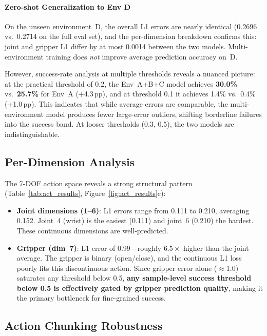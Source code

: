 \documentclass[10pt,twocolumn,letterpaper]{article}
\begin{document}
\paragraph{Zero-shot Generalization to Env D} On the unseen environment~D, the overall L1 errors are nearly identical (0.2696 vs.\ 0.2714 on the full eval set), and the per-dimension breakdown confirms this: joint and gripper L1 differ by at most 0.0014 between the two models. Multi-environment training does \emph{not} improve average prediction accuracy on~D.

However, success-rate analysis at multiple thresholds reveals a nuanced picture: at the practical threshold of 0.2, the Env~A+B+C model achieves \textbf{30.0\%} vs.\ \textbf{25.7\%} for Env~A (+4.3\,pp), and at threshold 0.1 it achieves 1.4\% vs.\ 0.4\% (+1.0\,pp). This indicates that while average errors are comparable, the multi-environment model produces fewer large-error outliers, shifting borderline failures into the success band. At looser thresholds (0.3, 0.5), the two models are indistinguishable.

\subsection{Per-Dimension Analysis}

The 7-DOF action space reveals a strong structural pattern (Table~\ref{tab:act_results}, Figure~\ref{fig:act_results}c):
\begin{itemize}
\item \textbf{Joint dimensions (1--6)}: L1 errors range from 0.111 to 0.210, averaging 0.152. Joint~4 (wrist) is the easiest (0.111) and joint~6 (0.210) the hardest. These continuous dimensions are well-predicted.
\item \textbf{Gripper (dim~7)}: L1 error of 0.99---roughly $6.5\times$ higher than the joint average. The gripper is binary (open/close), and the continuous L1 loss poorly fits this discontinuous action. Since gripper error alone ($\approx$1.0) saturates any threshold below 0.5, \textbf{any sample-level success threshold below 0.5 is effectively gated by gripper prediction quality}, making it the primary bottleneck for fine-grained success.
\end{itemize}

\subsection{Action Chunking Robustness}
\end{document}
